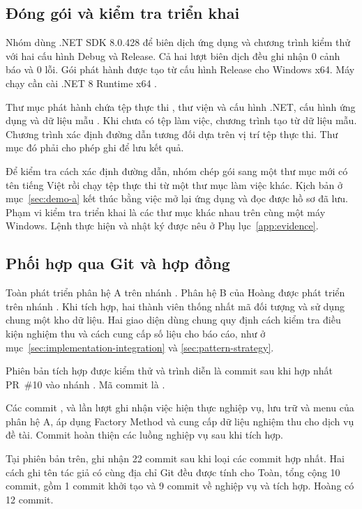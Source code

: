 \label{sec:delivery}
\subsection{Đóng gói và kiểm tra triển khai}\label{sec:packaged-app}
Nhóm dùng .NET SDK 8.0.428 để biên dịch ứng dụng và chương trình kiểm thử với hai cấu hình Debug và Release. Cả hai lượt biên dịch đều ghi nhận 0 cảnh báo và 0 lỗi. Gói phát hành được tạo từ cấu hình Release cho Windows x64. Máy chạy cần cài .NET 8 Runtime x64 .

Thư mục phát hành chứa tệp thực thi , thư viện và cấu hình .NET, cấu hình ứng dụng  và dữ liệu mẫu . Khi chưa có tệp làm việc, chương trình tạo  từ dữ liệu mẫu. Chương trình xác định đường dẫn tương đối dựa trên vị trí tệp thực thi. Thư mục đó phải cho phép ghi để lưu kết quả.

Để kiểm tra cách xác định đường dẫn, nhóm chép gói sang một thư mục mới có tên tiếng Việt rồi chạy tệp thực thi từ một thư mục làm việc khác. Kịch bản ở mục~\ref{sec:demo-a} kết thúc bằng việc mở lại ứng dụng và đọc được hồ sơ đã lưu. Phạm vi kiểm tra triển khai là các thư mục khác nhau trên cùng một máy Windows. Lệnh thực hiện và nhật ký được nêu ở Phụ lục~\ref{app:evidence}.

\subsection{Phối hợp qua Git và hợp đồng}\label{sec:git-history}
Toàn phát triển phân hệ A trên nhánh . Phân hệ B của Hoàng được phát triển trên nhánh . Khi tích hợp, hai thành viên thống nhất mã đối tượng và sử dụng chung một kho dữ liệu. Hai giao diện dùng chung quy định cách kiểm tra điều kiện nghiệm thu và cách cung cấp số liệu cho báo cáo, như ở mục~\ref{sec:implementation-integration} và \ref{sec:pattern-strategy}.

Phiên bản tích hợp được kiểm thử và trình diễn là commit sau khi hợp nhất PR~\#10 vào nhánh . Mã commit là \href{https://github.com/PKT-zZ/QLNCKH_OOP_FINAL/commit/28fb531f270ac358725c6c35e261be164b4016f6}{}.

Các commit ,  và  lần lượt ghi nhận việc hiện thực nghiệp vụ, lưu trữ và menu của phân hệ A, áp dụng Factory Method và cung cấp dữ liệu nghiệm thu cho dịch vụ đề tài. Commit  hoàn thiện các luồng nghiệp vụ sau khi tích hợp.

Tại phiên bản trên,  ghi nhận 22 commit sau khi loại các commit hợp nhất. Hai cách ghi tên tác giả có cùng địa chỉ Git đều được tính cho Toàn, tổng cộng 10 commit, gồm 1 commit khởi tạo và 9 commit về nghiệp vụ và tích hợp. Hoàng có 12 commit.
